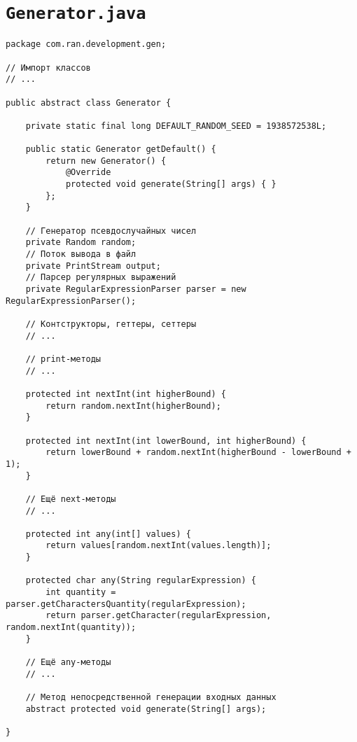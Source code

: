 \section*{\texttt{Generator.java}}
\begin{verbatim}
package com.ran.development.gen;

// Импорт классов
// ...

public abstract class Generator {

    private static final long DEFAULT_RANDOM_SEED = 1938572538L;
    
    public static Generator getDefault() {
        return new Generator() {
            @Override
            protected void generate(String[] args) { }
        };
    }
    
    // Генератор псевдослучайных чисел
    private Random random;
    // Поток вывода в файл
    private PrintStream output;
    // Парсер регулярных выражений
    private RegularExpressionParser parser = new RegularExpressionParser();
    
    // Контструкторы, геттеры, сеттеры
    // ...
    
    // print-методы
    // ...
    
    protected int nextInt(int higherBound) {
        return random.nextInt(higherBound);
    }
    
    protected int nextInt(int lowerBound, int higherBound) {
        return lowerBound + random.nextInt(higherBound - lowerBound + 1);
    }
    
    // Ещё next-методы
    // ...
    
    protected int any(int[] values) {
        return values[random.nextInt(values.length)];
    }
    
    protected char any(String regularExpression) {
        int quantity = parser.getCharactersQuantity(regularExpression);
        return parser.getCharacter(regularExpression, random.nextInt(quantity));
    }
    
    // Ещё any-методы
    // ...
    
    // Метод непосредственной генерации входных данных
    abstract protected void generate(String[] args);
    
}
\end{verbatim}

